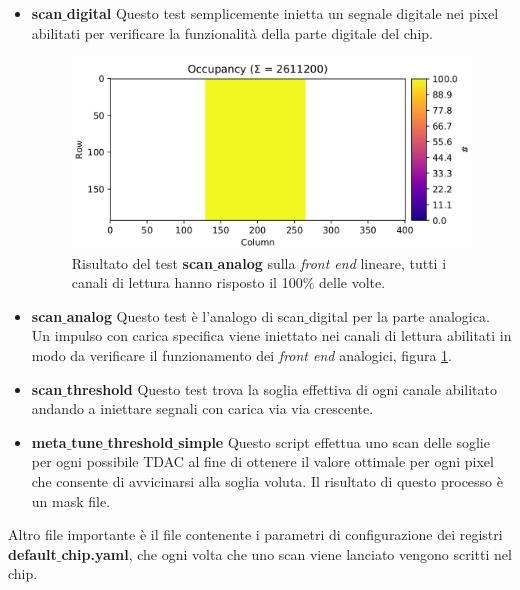 \begin{itemize}
\item \textbf{scan$\_$digital} Questo test semplicemente inietta un segnale digitale nei pixel abilitati per verificare la funzionalità della parte digitale del chip.%
\begin{figure}
\centering
\includegraphics[width=\textwidth]{Immagini/ScanAnalogLinear}
\caption{Risultato del test \textbf{scan$\_$analog} sulla \textit{front end} lineare, tutti i canali di lettura hanno risposto il 100$\%$ delle volte.}
\label{ScanAnalogLinear}
\end{figure}
\item \textbf{scan$\_$analog}  Questo test è l'analogo di scan$\_$digital per la parte analogica. Un impulso con carica specifica viene iniettato nei canali di lettura abilitati in modo da verificare il funzionamento dei \textit{front end} analogici, figura \ref{ScanAnalogLinear}. %
\item \textbf{scan$\_$threshold}  Questo test trova la soglia effettiva di ogni canale abilitato andando a iniettare segnali con carica via via crescente.%
\item \textbf{meta$\_$tune$\_$threshold$\_$simple} Questo script effettua uno scan delle soglie per ogni possibile TDAC al fine di ottenere il valore ottimale per ogni pixel che consente di avvicinarsi alla soglia voluta. Il risultato di questo processo è un mask file.%
\end{itemize}
Altro file importante è il file contenente i parametri di configurazione dei registri \textbf{default$\_$chip.yaml}, che ogni volta che uno scan viene lanciato vengono scritti nel chip. 

